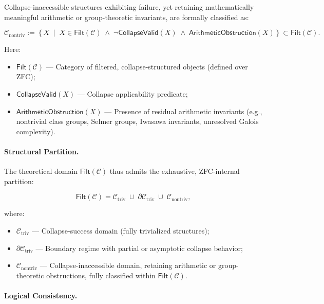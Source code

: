 \documentclass[11pt]{article}
\begin{document}
Collapse-inaccessible structures exhibiting failure, yet retaining mathematically meaningful arithmetic or group-theoretic invariants, are formally classified as:

\[
\mathcal{C}_{\mathrm{nontriv}} := \left\{ X \;\middle|\; X \in \mathsf{Filt}(\mathcal{C}) \;\land\; \neg \mathsf{CollapseValid}(X) \;\land\; \mathsf{ArithmeticObstruction}(X) \right\} \subset \mathsf{Filt}(\mathcal{C}).
\]

Here:
\begin{itemize}
    \item $\mathsf{Filt}(\mathcal{C})$ — Category of filtered, collapse-structured objects (defined over ZFC);
    \item $\mathsf{CollapseValid}(X)$ — Collapse applicability predicate;
    \item $\mathsf{ArithmeticObstruction}(X)$ — Presence of residual arithmetic invariants (e.g., nontrivial class groups, Selmer groups, Iwasawa invariants, unresolved Galois complexity).
\end{itemize}

\paragraph{Structural Partition.}

The theoretical domain $\mathsf{Filt}(\mathcal{C})$ thus admits the exhaustive, ZFC-internal partition:

\[
\mathsf{Filt}(\mathcal{C}) = \mathcal{C}_{\mathrm{triv}} \;\cup\; \partial \mathcal{C}_{\mathrm{triv}} \;\cup\; \mathcal{C}_{\mathrm{nontriv}},
\]

where:

\begin{itemize}
    \item $\mathcal{C}_{\mathrm{triv}}$ — Collapse-success domain (fully trivialized structures);
    \item $\partial \mathcal{C}_{\mathrm{triv}}$ — Boundary regime with partial or asymptotic collapse behavior;
    \item $\mathcal{C}_{\mathrm{nontriv}}$ — Collapse-inaccessible domain, retaining arithmetic or group-theoretic obstructions, fully classified within $\mathsf{Filt}(\mathcal{C})$.
\end{itemize}

\paragraph{Logical Consistency.}
\end{document}
